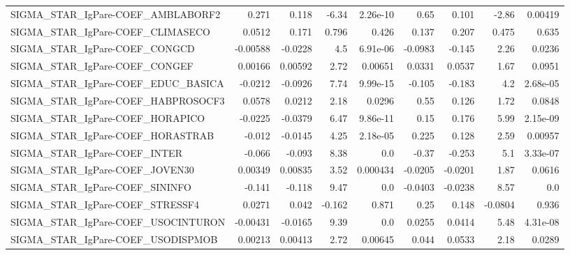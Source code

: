 \begin{tabular}{lrrrrrrrr}
SIGMA\_STAR\_IgPare-COEF\_AMBLABORF2      &       0.271 &        0.118 &   -6.34 & 2.26e-10 &       0.65 &       0.101 &        -2.86 &       0.00419 \\
SIGMA\_STAR\_IgPare-COEF\_CLIMASECO       &      0.0512 &        0.171 &   0.796 &    0.426 &      0.137 &       0.207 &        0.475 &         0.635 \\
SIGMA\_STAR\_IgPare-COEF\_CONGCD          &    -0.00588 &      -0.0228 &     4.5 & 6.91e-06 &    -0.0983 &      -0.145 &         2.26 &        0.0236 \\
SIGMA\_STAR\_IgPare-COEF\_CONGEF          &     0.00166 &      0.00592 &    2.72 &  0.00651 &     0.0331 &      0.0537 &         1.67 &        0.0951 \\
SIGMA\_STAR\_IgPare-COEF\_EDUC\_BASICA     &     -0.0212 &      -0.0926 &    7.74 & 9.99e-15 &     -0.105 &      -0.183 &          4.2 &      2.68e-05 \\
SIGMA\_STAR\_IgPare-COEF\_HABPROSOCF3     &      0.0578 &       0.0212 &    2.18 &   0.0296 &       0.55 &       0.126 &         1.72 &        0.0848 \\
SIGMA\_STAR\_IgPare-COEF\_HORAPICO        &     -0.0225 &      -0.0379 &    6.47 & 9.86e-11 &       0.15 &       0.176 &         5.99 &      2.15e-09 \\
SIGMA\_STAR\_IgPare-COEF\_HORASTRAB       &      -0.012 &      -0.0145 &    4.25 & 2.18e-05 &      0.225 &       0.128 &         2.59 &       0.00957 \\
SIGMA\_STAR\_IgPare-COEF\_INTER           &      -0.066 &       -0.093 &    8.38 &      0.0 &      -0.37 &      -0.253 &          5.1 &      3.33e-07 \\
SIGMA\_STAR\_IgPare-COEF\_JOVEN30         &     0.00349 &      0.00835 &    3.52 & 0.000434 &    -0.0205 &     -0.0201 &         1.87 &        0.0616 \\
SIGMA\_STAR\_IgPare-COEF\_SININFO         &      -0.141 &       -0.118 &    9.47 &      0.0 &    -0.0403 &     -0.0238 &         8.57 &           0.0 \\
SIGMA\_STAR\_IgPare-COEF\_STRESSF4        &      0.0271 &        0.042 &  -0.162 &    0.871 &       0.25 &       0.148 &      -0.0804 &         0.936 \\
SIGMA\_STAR\_IgPare-COEF\_USOCINTURON     &    -0.00431 &      -0.0165 &    9.39 &      0.0 &     0.0255 &      0.0414 &         5.48 &      4.31e-08 \\
SIGMA\_STAR\_IgPare-COEF\_USODISPMOB      &     0.00213 &      0.00413 &    2.72 &  0.00645 &      0.044 &      0.0533 &         2.18 &        0.0289 \\

\end{tabular}
